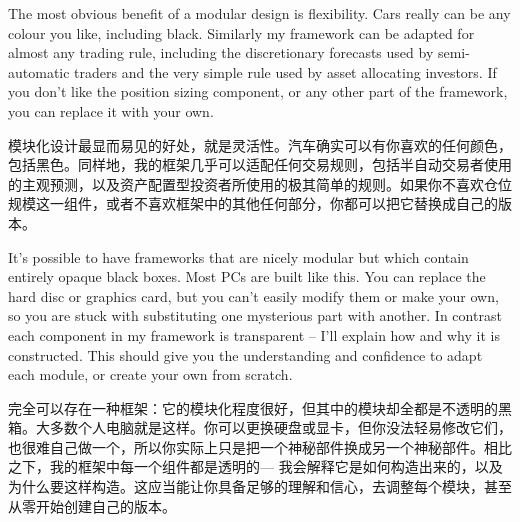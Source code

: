 
\begin{englishblock} The most obvious benefit of a modular design is flexibility. Cars really can be any colour you like, including black. Similarly my framework can be adapted for almost any trading rule, including the discretionary forecasts used by semi-automatic traders and the very simple rule used by asset allocating investors. If you don't like the position sizing component, or any other part of the framework, you can replace it with your own. \end{englishblock}

\begin{chineseblock}模块化设计最显而易见的好处，就是灵活性。汽车确实可以有你喜欢的任何颜色，包括黑色。同样地，我的框架几乎可以适配任何交易规则，包括半自动交易者使用的主观预测，以及资产配置型投资者所使用的极其简单的规则。如果你不喜欢仓位规模这一组件，或者不喜欢框架中的其他任何部分，你都可以把它替换成自己的版本。\end{chineseblock}


\begin{englishblock} It's possible to have frameworks that are nicely modular but which contain entirely opaque black boxes. Most PCs are built like this. You can replace the hard disc or graphics card, but you can't easily modify them or make your own, so you are stuck with substituting one mysterious part with another. In contrast each component in my framework is transparent -- I'll explain how and why it is constructed. This should give you the understanding and confidence to adapt each module, or create your own from scratch. \end{englishblock}

\begin{chineseblock}完全可以存在一种框架：它的模块化程度很好，但其中的模块却全都是不透明的黑箱。大多数个人电脑就是这样。你可以更换硬盘或显卡，但你没法轻易修改它们，也很难自己做一个，所以你实际上只是把一个神秘部件换成另一个神秘部件。相比之下，我的框架中每一个组件都是透明的--- 我会解释它是如何构造出来的，以及为什么要这样构造。这应当能让你具备足够的理解和信心，去调整每个模块，甚至从零开始创建自己的版本。\end{chineseblock}


